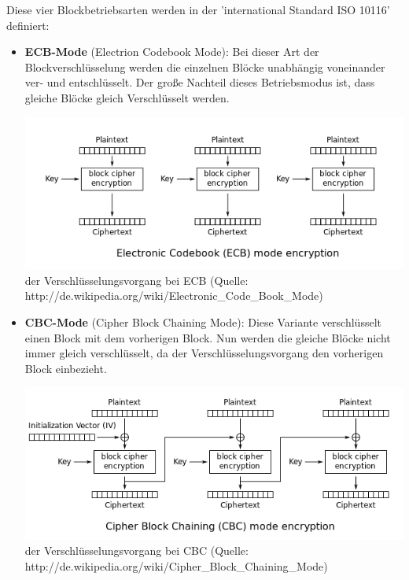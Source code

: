 \documentclass[12pt,a4paper]{report}
\begin{document}
\begin{onehalfspace}
Diese vier Blockbetriebsarten werden in der 'international Standard ISO 10116' definiert:

\begin{itemize}
\item \textbf{ECB-Mode} (Electrion Codebook Mode): Bei dieser Art der Blockverschlüsselung werden die einzelnen Blöcke unabhängig voneinander ver- und entschlüsselt. Der große Nachteil dieses Betriebsmodus ist, dass gleiche Blöcke gleich Verschlüsselt werden.

\begin{center}
\includegraphics[scale=0.7]{img/ecb.png}\\
der Verschlüsselungsvorgang bei ECB (Quelle: http://de.wikipedia.org/wiki/Electronic\_Code\_Book\_Mode)
\end{center}

\item \textbf{CBC-Mode} (Cipher Block Chaining Mode): Diese Variante verschlüsselt einen Block mit dem vorherigen Block. Nun werden die gleiche Blöcke nicht immer gleich verschlüsselt, da der Verschlüsselungsvorgang den vorherigen Block einbezieht.

\begin{center}
\includegraphics[scale=0.7]{img/cbc.png}\\
der Verschlüsselungsvorgang bei CBC (Quelle: http://de.wikipedia.org/wiki/Cipher\_Block\_Chaining\_Mode)
\end{center}


\end{itemize}
\end{onehalfspace}
\end{document}
